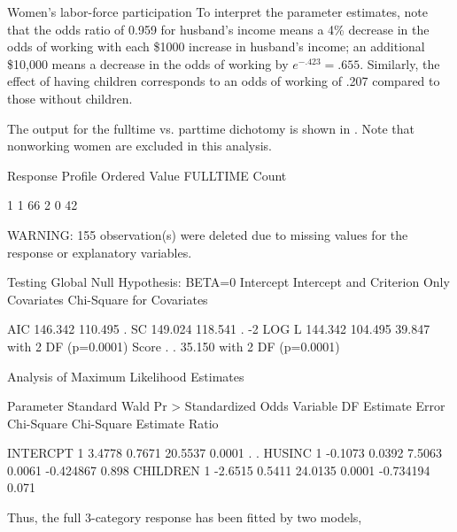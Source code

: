\begin{Example}[wlfpart]{Women's labor-force participation}
To interpret the parameter estimates, note that the odds ratio of 0.959
for husband's income
means a 4\% decrease in the odds of working with each \$1000 increase in husband's income; an additional \$10,000 means a decrease in the odds
of working by
\(e^{-.423} = .655\).  Similarly, the effect of having children  corresponds
to an odds of working of .207 compared to those without children.

The output for the fulltime vs. parttime dichotomy is shown in
.
Note that nonworking women are excluded in this analysis.

\begin{Output}[htb]
\caption{Women's labor-force data, analysis of the fulltime/parttime dichotomy}\label{out:wlfpart.3}
\small
\begin{output}
                                Response Profile
                          Ordered
                            Value  FULLTIME     Count

                                1         1        66
                                2         0        42

   WARNING: 155 observation(s) were deleted due to missing values for
           the response or explanatory variables.

                   Testing Global Null Hypothesis: BETA=0
                             Intercept
                Intercept       and
   Criterion      Only      Covariates   Chi-Square for Covariates

   AIC            146.342      110.495      .
   SC             149.024      118.541      .
   -2 LOG L       144.342      104.495    39.847 with 2 DF (p=0.0001)
   Score             .            .       35.150 with 2 DF (p=0.0001)

                    Analysis of Maximum Likelihood Estimates

               Parameter Standard    Wald       Pr >    Standardized    Odds
   Variable DF  Estimate   Error  Chi-Square Chi-Square   Estimate     Ratio

   INTERCPT 1     3.4778   0.7671    20.5537     0.0001            .    .
   HUSINC   1    -0.1073   0.0392     7.5063     0.0061    -0.424867   0.898
   CHILDREN 1    -2.6515   0.5411    24.0135     0.0001    -0.734194   0.071
\end{output}
\end{Output}

Thus, the full 3-category response has been fitted by two models,


\end{Example}

